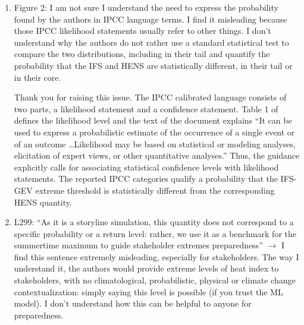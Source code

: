 \documentclass[11pt]{article}
\newcommand{\newTxt}{\textcolor{cadmiumgreen}}
\begin{document}
\begin{enumerate}
    \newTxt{Thank you for this comment. All of our analysis either looks at the ensemble maxima (without trying to estimate a specified threshold) or GEV-based extrapolation to quantiles beyond the range of the data.}
    
    \item Figure 2: I am not sure I understand the need to express the probability found by the authors in IPCC language terms. I find it misleading because those IPCC likelihood statements usually refer to other things. I don’t understand why the authors do not rather use a standard statistical test to compare the two distributions, including in their tail and quantify the probability that the IFS and HENS are statistically different, in their tail or in their core.

    \newTxt{Thank you for raising this issue. The IPCC calibrated language consists of two parts, a likelihood statement and a confidence statement. Table 1 of \cite{mastrandrea2010guidance} defines the likelihood level and the text of the document explains ``It can be used to express a probabilistic estimate of the occurrence of a single event or of an outcome \dots Likelihood may be based on statistical or modeling analyses, elicitation of expert views, or other quantitative analyses.'' Thus, the guidance explicitly calls for associating statistical confidence levels with likelihood statements. The reported IPCC categories qualify a probability that the IFS-GEV extreme threshold is statistically different from the corresponding HENS quantity.}


    \item L299: “As it is a storyline simulation, this quantity does not correspond to a specific probability or a return level: rather, we use it as a benchmark for the summertime maximum to guide stakeholder extremes preparedness” $\rightarrow$ I find this sentence extremely misleading, especially for stakeholders. The way I understand it, the authors would provide extreme levels of heat index to stakeholders, with no climatological, probabilistic, physical or climate change contextualization: simply saying this level is possible (if you trust the ML model). I don’t understand how this can be helpful to anyone for preparedness.


\end{enumerate}
\end{document}
